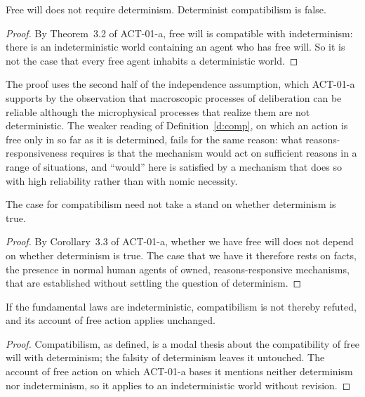 \documentclass{situationist-preprint}
\begin{document}
\begin{proposition}\label{p:notreq}
Free will does not require determinism. Determinist compatibilism is false.
\end{proposition}

\begin{proof}
By Theorem~3.2 of ACT-01-a, free will is compatible with indeterminism: there is an indeterministic world containing an agent who has free will. So it is not the case that every free agent inhabits a deterministic world.
\end{proof}

The proof uses the second half of the independence assumption, which ACT-01-a supports by the observation that macroscopic processes of deliberation can be reliable although the microphysical processes that realize them are not deterministic. The weaker reading of Definition~\ref{d:comp}, on which an action is free only in so far as it is determined, fails for the same reason: what reasons-responsiveness requires is that the mechanism would act on sufficient reasons in a range of situations, and \enquote{would} here is satisfied by a mechanism that does so with high reliability rather than with nomic necessity.

\begin{proposition}\label{p:neutral}
The case for compatibilism need not take a stand on whether determinism is true.
\end{proposition}

\begin{proof}
By Corollary~3.3 of ACT-01-a, whether we have free will does not depend on whether determinism is true. The case that we have it therefore rests on facts, the presence in normal human agents of owned, reasons-responsive mechanisms, that are established without settling the question of determinism.
\end{proof}

\begin{proposition}\label{p:indetfree}
If the fundamental laws are indeterministic, compatibilism is not thereby refuted, and its account of free action applies unchanged.
\end{proposition}

\begin{proof}
Compatibilism, as defined, is a modal thesis about the compatibility of free will with determinism; the falsity of determinism leaves it untouched. The account of free action on which ACT-01-a bases it mentions neither determinism nor indeterminism, so it applies to an indeterministic world without revision.
\end{proof}
\end{document}
